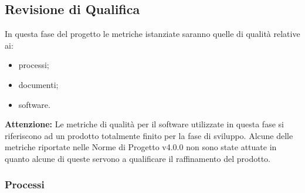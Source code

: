 \clearpage
\subsection{Revisione di Qualifica}
\label{sec:revisione_qualifica}
In questa fase del progetto le metriche istanziate saranno quelle di qualità relative ai:
\begin{itemize}
	\item processi;
	\item documenti;
	\item software.
\end{itemize}
\textbf{Attenzione:} Le metriche di qualità per il software utilizzate in questa fase si riferiscono ad un prodotto totalmente finito per la fase di sviluppo. Alcune delle metriche riportate nelle Norme di Progetto v4.0.0 non sono state attuate in quanto alcune di queste servono a qualificare il raffinamento del prodotto.
\subsubsection{Processi}
